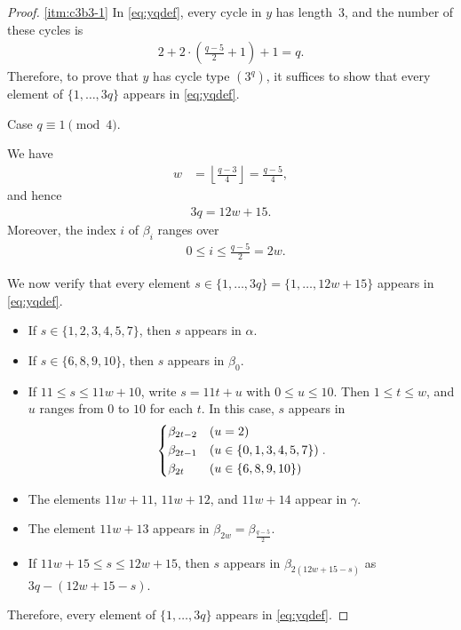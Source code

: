 \documentclass[12pt,reqno]{amsart}
\newcommand{\A}{\alpha}									%
\newcommand{\B}{\beta}									%
\newcommand{\G}{\gamma}								%
\newcommand{\HL}{\vspace{2mm}}							%
\newcommand{\f}[2]{\frac{#1}{#2}}							%
\newcommand{\fl}[1]{\left\lfloor #1 \right\rfloor}					%
\theoremstyle{mythmstyle}
\theoremstyle{mydefstyle}
\numberwithin{equation}{section}
\begin{document}
\begin{proof}
\ref{itm:c3b3-1}
In \eqref{eq:yqdef}, every cycle in $y$ has length~$3$, and the number of these cycles is
\begin{align}
2 + 2\cdot\left(\f{q-5}{2}+1\right) + 1 = q.
\end{align}
Therefore, to prove that $y$ has cycle type $(3^{q})$, it suffices to show that every element of $\{ 1, \ldots, 3q \}$ appears
in \eqref{eq:yqdef}.
\HL

\item[(i)] Case $q \equiv 1 \pmod{4}$.

We have
\begin{align}
w &=  \fl{\f{q-3}{4}} = \f{q-5}{4},
\end{align}
and hence
\begin{align}
3q = 12w+15.
\end{align}
Moreover, the index $i$ of $\B_{i}$ ranges over
\begin{align}
&0 \le i \le \f{q-5}{2} =  2w.
\end{align}

We now verify that every element $s \in \{1, \ldots, 3q\} = \{1, \ldots, 12w+15\}$ appears in \eqref{eq:yqdef}.
\begin{itemize}
\item If $s \in \{ 1, 2, 3, 4, 5, 7 \}$, then $s$ appears in $\A$.
\item If $s \in \{ 6, 8, 9, 10 \}$, then $s$ appears in $\B_{0}$.
\item If $11 \le s \le 11w+10$, write $s = 11t+u$ with $0 \le u \le 10$. Then $1 \le t \le w$,
and $u$ ranges from $0$ to $10$ for each $t$. In this case, $s$ appears in
\begin{align}
\begin{dcases}
\B_{2t-2} & (u = 2) \\
\B_{2t-1} & (u \in \{ 0, 1, 3, 4, 5, 7 \}) \\
\B_{2t} & (u \in \{ 6, 8, 9, 10 \})
\end{dcases}.
\end{align}
\item The elements $11w+11$, $11w+12$, and $11w+14$ appear in $\G$.
\item The element $11w+13$ appears in $\B_{2w} = \B_{\f{q-5}{2}}$.
\item If $11w+15 \le s \le 12w+15$, then $s$ appears in $\B_{2(12w+15-s)}$ as $3q-(12w+15-s)$.
\end{itemize}
Therefore, every element of $\{ 1, \ldots, 3q \}$ appears in  \eqref{eq:yqdef}.
\HL


\end{proof}
\end{document}
